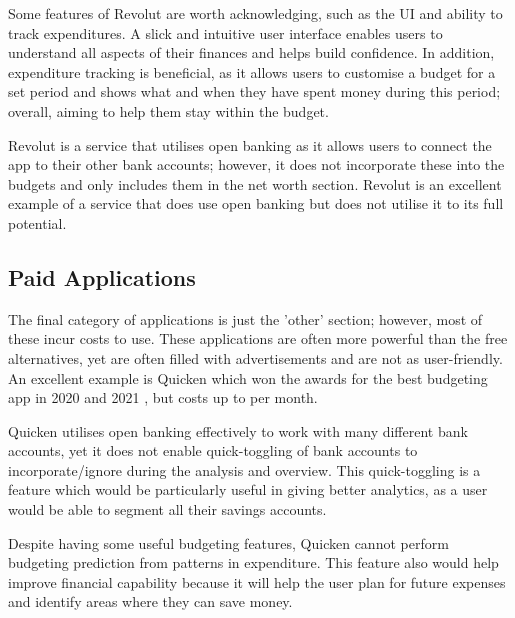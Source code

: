 Some features of Revolut are worth acknowledging, such as the UI and ability to track expenditures. A slick and intuitive user interface enables users to understand all aspects of their finances and helps build confidence. In addition, expenditure tracking is beneficial, as it allows users to customise a budget for a set period and shows what and when they have spent money during this period; overall, aiming to help them stay within the budget.

Revolut is a service that utilises open banking as it allows users to connect the app to their other bank accounts; however, it does not incorporate these into the budgets and only includes them in the net worth section. Revolut is an excellent example of a service that does use open banking but does not utilise it to its full potential.

\subsection{Paid Applications}
\label{sec:paid-applications}
The final category of applications is just the 'other' section; however, most of these incur costs to use. These applications are often more powerful than the free alternatives, yet are often filled with advertisements and are not as user-friendly. An excellent example is Quicken which won the awards for the best budgeting app in 2020 and 2021 \cite{Quicken}, but costs up to  per month.

Quicken utilises open banking effectively to work with many different bank accounts, yet it does not enable quick-toggling of bank accounts to incorporate/ignore during the analysis and overview. This quick-toggling is a feature which would be particularly useful in giving better analytics, as a user would be able to segment all their savings accounts.

Despite having some useful budgeting features, Quicken cannot perform budgeting prediction from patterns in expenditure. This feature also would help improve financial capability because it will help the user plan for future expenses and identify areas where they can save money.

